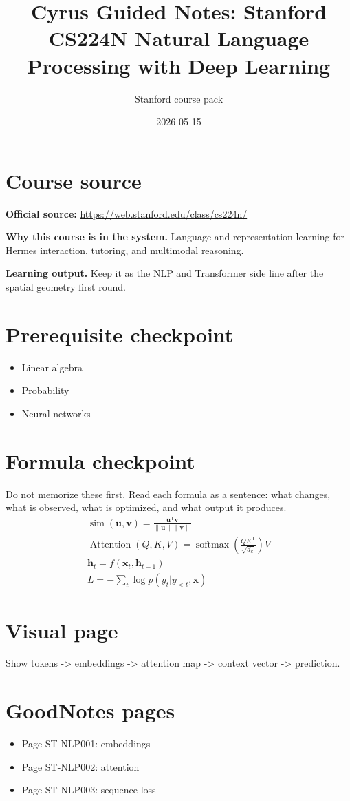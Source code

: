 \documentclass[11pt]{article}
\title{Cyrus Guided Notes: Stanford CS224N Natural Language Processing with Deep Learning}
\author{Stanford course pack}
\date{2026-05-15}
\begin{document}
\maketitle

\section*{Course source}
\textbf{Official source:} \url{https://web.stanford.edu/class/cs224n/}

\textbf{Why this course is in the system.} Language and representation learning for Hermes interaction, tutoring, and multimodal reasoning.

\textbf{Learning output.} Keep it as the NLP and Transformer side line after the spatial geometry first round.

\section*{Prerequisite checkpoint}
\begin{itemize}[leftmargin=1.4em]
  \item Linear algebra
  \item Probability
  \item Neural networks
\end{itemize}

\section*{Formula checkpoint}
Do not memorize these first. Read each formula as a sentence: what changes, what is observed, what is optimized, and what output it produces.
\begin{align*}
  \operatorname{sim}(\bm{u},\bm{v})=\frac{\bm{u}^{\mathsf T}\bm{v}}{\|\bm{u}\|\|\bm{v}\|}\\
  \operatorname{Attention}(Q,K,V)=\operatorname{softmax}\left(\frac{QK^{\mathsf T}}{\sqrt{d_k}}\right)V\\
  \bm{h}_t=f(\bm{x}_t,\bm{h}_{t-1})\\
  L=-\sum_t \log p(y_t|y_{<t},\bm{x})
\end{align*}

\section*{Visual page}
Show tokens -> embeddings -> attention map -> context vector -> prediction.

\section*{GoodNotes pages}
\begin{itemize}[leftmargin=1.4em]
  \item Page ST-NLP001: embeddings
  \item Page ST-NLP002: attention
  \item Page ST-NLP003: sequence loss
\end{itemize}
\end{document}
